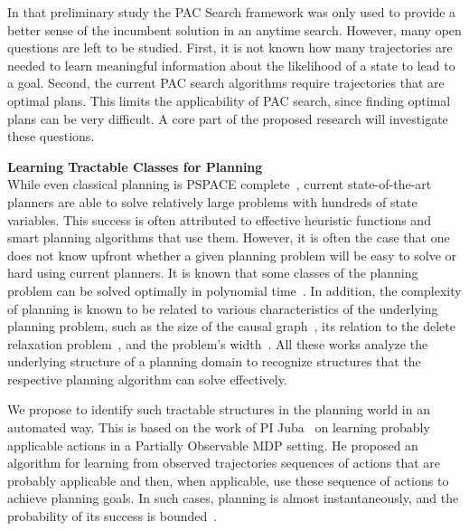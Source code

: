 \documentclass[12pt]{article}
\begin{document}
In that preliminary study the PAC Search framework was only used to provide a better sense of the incumbent solution in an anytime search. However, many open questions are left to be studied. First, it is not known how many trajectories are needed to learn meaningful information about the likelihood of a state to lead to a goal. Second, the current PAC search algorithms require trajectories that are optimal plans. This limits the applicability of PAC search, since finding optimal plans can be very difficult. A core part of the proposed research will investigate these questions. 




{\bf Learning Tractable Classes for Planning}\\
While even classical planning is PSPACE complete~\cite{bylander1994computational}, 
current state-of-the-art planners are able to solve relatively large problems with hundreds of state variables. This success is often attributed to effective heuristic functions and smart planning algorithms that use them. However, it is often the case that one does not know upfront whether a given planning problem will be easy to solve or hard using current planners. It is known that some classes of the planning problem can be solved optimally in polynomial time~\cite{katz2008new}. In addition, the complexity of planning is known to be related to various characteristics of the underlying planning problem, such as the size of the causal graph~\cite{gimenez2012influence}, its relation to the delete relaxation problem~\cite{hoffmann2011analyzing}, and the problem's width~\cite{lipovetzky2012width}. All these works analyze the underlying structure of a planning domain to recognize structures that the respective planning algorithm can solve effectively. %

We propose to identify such tractable structures in the planning world in an automated way. This is based on the work of PI Juba~\cite{jmlrPaper?} on learning probably applicable 
actions in a Partially Observable MDP setting. He proposed 
an algorithm for learning from observed trajectories sequences of actions that are probably applicable and then, when applicable, use these sequence of actions to achieve planning goals. 
In such cases, planning is almost instantaneously, and the probability of its success is bounded~\cite{jmlr}. 
\end{document}
